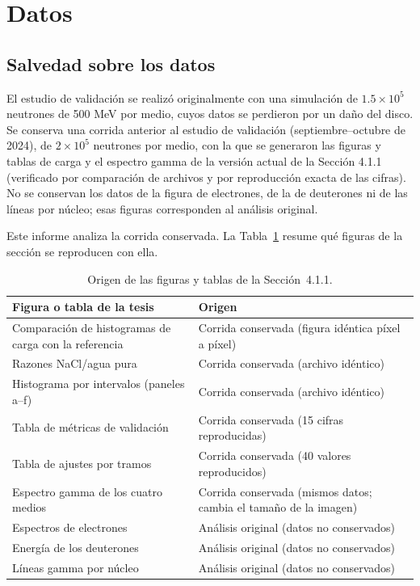 \documentclass[11pt,a4paper]{article}
\begin{document}
\section{Datos}
\label{sec:datos}

\subsection{Salvedad sobre los datos}
\label{sec:salvedad}

El estudio de validación se realizó originalmente con una simulación de $1.5\times10^5$ neutrones de 500 MeV por medio, cuyos datos se perdieron por un daño del disco. Se conserva una corrida anterior al estudio de validación (septiembre--octubre de 2024), de $2\times10^5$ neutrones por medio, con la que se generaron las figuras y tablas de carga y el espectro gamma de la versión actual de la Sección 4.1.1 (verificado por comparación de archivos y por reproducción exacta de las cifras). No se conservan los datos de la figura de electrones, de la de deuterones ni de las líneas por núcleo; esas figuras corresponden al análisis original.

Este informe analiza la corrida conservada. La Tabla~\ref{tab:fuente} resume qué figuras de la sección se reproducen con ella.

\begin{table}[H]
\centering\small
\caption{Origen de las figuras y tablas de la Sección~4.1.1.}
\label{tab:fuente}
\begin{tabularx}{\linewidth}{@{}>{\raggedright\arraybackslash}p{6.2cm}>{\raggedright\arraybackslash}X@{}}
\toprule
\textbf{Figura o tabla de la tesis} & \textbf{Origen} \\
\midrule
Comparación de histogramas de carga con la referencia & Corrida conservada (figura idéntica píxel a píxel) \\
Razones NaCl/agua pura & Corrida conservada (archivo idéntico) \\
Histograma por intervalos (paneles a--f) & Corrida conservada (archivo idéntico) \\
Tabla de métricas de validación & Corrida conservada (15 cifras reproducidas) \\
Tabla de ajustes por tramos & Corrida conservada (40 valores reproducidos) \\
Espectro gamma de los cuatro medios & Corrida conservada (mismos datos; cambia el tamaño de la imagen) \\
Espectros de electrones & Análisis original (datos no conservados) \\
Energía de los deuterones & Análisis original (datos no conservados) \\
Líneas gamma por núcleo & Análisis original (datos no conservados) \\
\bottomrule
\end{tabularx}
\end{table}
\end{document}
